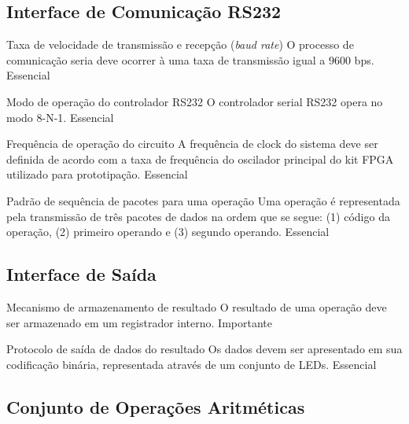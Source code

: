 \documentclass{article}
\begin{document}
  \subsection{Interface de Comunicação RS232}
  
    \begin{functional}
      \requirement
      {Taxa de velocidade de transmissão e recepção (\textit{baud rate})}
      {O processo de comunicação seria deve ocorrer à uma taxa de transmissão igual a $9600$ bps.}
      {Essencial}

      \requirement
      {Modo de operação do controlador RS232}
      {O controlador serial RS232 opera no modo 8-N-1.}
      {Essencial}      

      \requirement
      {Frequência de operação do circuito} 
      {A frequência de clock do sistema deve ser definida de acordo com a taxa de frequência do oscilador principal do kit FPGA utilizado para prototipação.}
      {Essencial}   

      \requirement
      {Padrão de sequência de pacotes para uma operação}
      {Uma operação é representada pela transmissão de três pacotes de dados na ordem que se segue: (1) código da operação, (2) primeiro operando e (3) segundo operando.}
      {Essencial}       

    \end{functional}

  \subsection{Interface de Saída}
  
    \begin{functional}
      \requirement
      {Mecanismo de armazenamento de resultado}
      {O resultado de uma operação deve ser armazenado em um registrador interno.}
      {Importante}

      \requirement
      {Protocolo de saída de dados do resultado}
      {Os dados devem ser apresentado em sua codificação binária, representada através de um conjunto de LEDs.}
      {Essencial} 

    \end{functional}  

  \subsection{Conjunto de Operações Aritméticas} 
  
\end{document}
